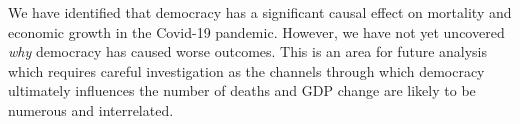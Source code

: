 We have identified that democracy has a significant causal effect on mortality and economic growth in the Covid-19 pandemic. However, we have not yet uncovered \emph{why} democracy has caused worse outcomes. This is an area for future analysis which requires careful investigation as the channels through which democracy ultimately influences the number of deaths and GDP change are likely to be numerous and interrelated.